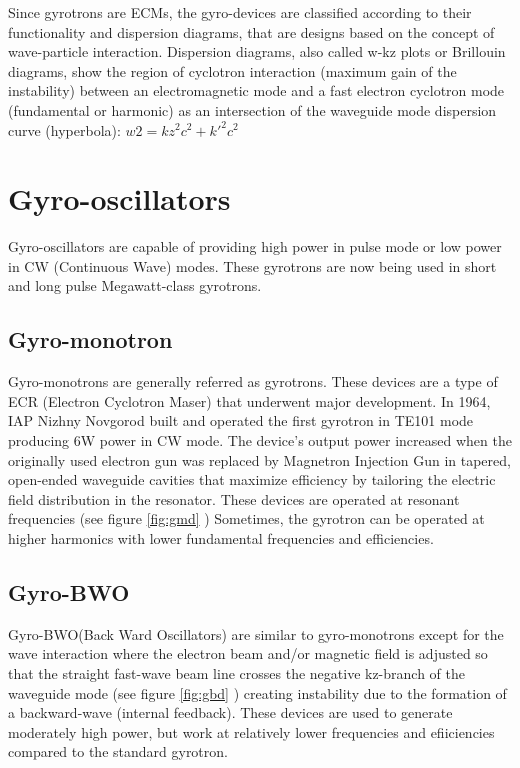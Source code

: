 Since gyrotrons are ECMs, the gyro-devices are classified according to their functionality and dispersion diagrams, that are designs based on the concept of wave-particle interaction. Dispersion diagrams, also called w-kz plots or Brillouin diagrams, show the region of cyclotron interaction (maximum gain of the instability) between an electromagnetic mode and a fast electron cyclotron mode (fundamental or harmonic) as an intersection of the waveguide mode dispersion curve (hyperbola): $ w2 = k z^2 c^2 + k'^2 c^2 $

\section{Gyro-oscillators}
Gyro-oscillators are capable of providing high power in pulse mode or low power in CW (Continuous Wave) modes.  These gyrotrons are now being used in short and long pulse Megawatt-class gyrotrons.
\subsection{Gyro-monotron}
Gyro-monotrons are generally referred as gyrotrons. These devices are a type of ECR (Electron Cyclotron Maser) that underwent major development.  In 1964, IAP Nizhny Novgorod built and operated the first gyrotron in TE101 mode producing 6W power in CW mode. The device's output power increased when the originally used electron gun was replaced by Magnetron Injection Gun in tapered, open-ended waveguide cavities that maximize efficiency by tailoring the electric field distribution in the resonator. These devices are operated at resonant frequencies (see figure \ref{fig:gmd} ) Sometimes, the gyrotron can be operated at higher harmonics with lower fundamental frequencies and efficiencies.

\subsection{Gyro-BWO}
Gyro-BWO(Back Ward Oscillators) are similar to gyro-monotrons except for the wave interaction where the electron beam and/or magnetic field is adjusted so that the straight fast-wave beam line crosses the negative kz-branch of the waveguide mode (see figure \ref{fig:gbd} ) creating instability due to the formation of a backward-wave (internal feedback). These devices are used to generate moderately high power, but work at relatively lower frequencies and efiiciencies compared to the standard gyrotron.\cite{ref:bwo}

